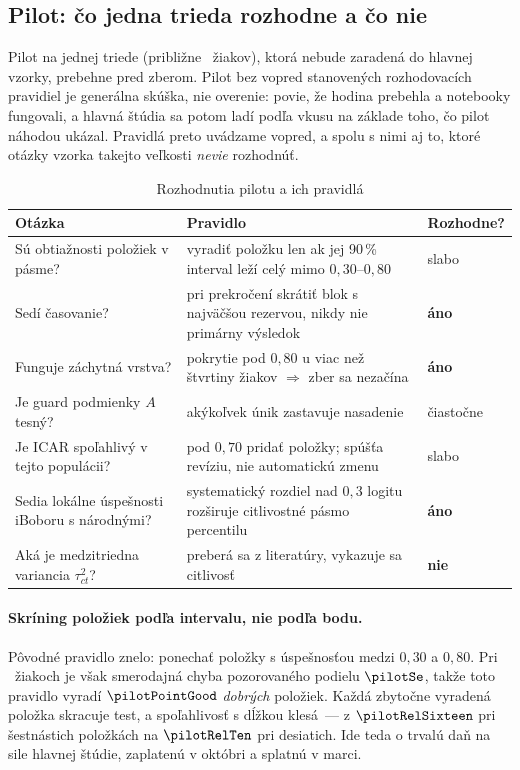 \subsection{Pilot: čo jedna trieda rozhodne a čo nie}
\label{sec:pilot}

Pilot na jednej triede (približne \pilotN{}~žiakov), ktorá nebude zaradená do hlavnej vzorky, prebehne pred zberom. Pilot bez vopred stanovených rozhodovacích pravidiel je generálna skúška, nie overenie: povie, že hodina prebehla a notebooky fungovali, a hlavná štúdia sa potom ladí podľa vkusu na základe toho, čo pilot náhodou ukázal. Pravidlá preto uvádzame vopred, a spolu s nimi aj to, ktoré otázky vzorka takejto veľkosti \emph{nevie} rozhodnúť.

\begin{table}[H]
\centering
\caption{Rozhodnutia pilotu a ich pravidlá}
\label{tab:pilot}
\scriptsize
\begin{tabularx}{\textwidth}{@{}X X l@{}}
\toprule
\textbf{Otázka} & \textbf{Pravidlo} & \textbf{Rozhodne?} \\
\midrule
Sú obtiažnosti položiek v pásme? & vyradiť položku len ak jej 90\,\% interval leží celý mimo $0{,}30$--$0{,}80$ & slabo \\
Sedí časovanie? & pri prekročení skrátiť blok s najväčšou rezervou, nikdy nie primárny výsledok & \textbf{áno} \\
Funguje záchytná vrstva? & pokrytie pod $0{,}80$ u viac než štvrtiny žiakov $\Rightarrow$ zber sa nezačína & \textbf{áno} \\
Je guard podmienky $A$ tesný? & akýkoľvek únik zastavuje nasadenie & čiastočne \\
Je ICAR spoľahlivý v tejto populácii? & pod $0{,}70$ pridať položky; spúšťa revíziu, nie automatickú zmenu & slabo \\
Sedia lokálne úspešnosti iBoboru s národnými? & systematický rozdiel nad $0{,}3$ logitu rozširuje citlivostné pásmo percentilu & \textbf{áno} \\
Aká je medzitriedna variancia $\tau^2_{ct}$? & preberá sa z literatúry, vykazuje sa citlivosť & \textbf{nie} \\
\bottomrule
\end{tabularx}
\end{table}

\paragraph{Skríning položiek podľa intervalu, nie podľa bodu.} Pôvodné pravidlo znelo: ponechať položky s úspešnosťou medzi $0{,}30$ a $0{,}80$. Pri \pilotN{}~žiakoch je však smerodajná chyba pozorovaného podielu $\pilotSe$, takže toto pravidlo vyradí $\pilotPointGood$ \emph{dobrých} položiek. Každá zbytočne vyradená položka skracuje test, a spoľahlivosť s dĺžkou klesá~--- z $\pilotRelSixteen$ pri šestnástich položkách na $\pilotRelTen$ pri desiatich. Ide teda o trvalú daň na sile hlavnej štúdie, zaplatenú v októbri a splatnú v marci.

